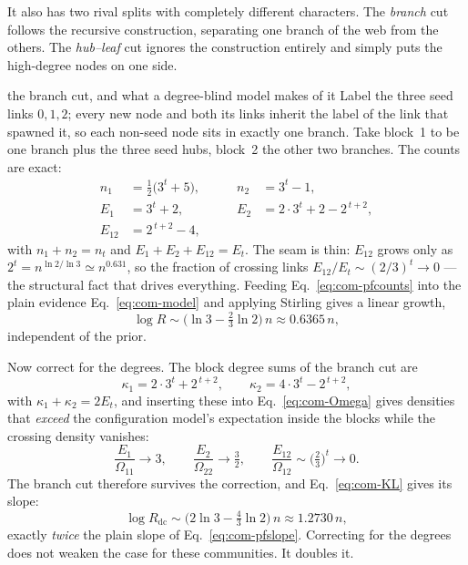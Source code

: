 It also has two rival splits with completely different characters. The
\emph{branch} cut follows the recursive construction, separating one branch of the
web from the others. The \emph{hub--leaf} cut ignores the construction entirely and
simply puts the high-degree nodes on one side.

\begin{calculation}{the branch cut, and what a degree-blind model makes of it}
Label the three seed links $0,1,2$; every new node and both its links inherit the
label of the link that spawned it, so each non-seed node sits in exactly one
branch. Take block~1 to be one branch plus the three seed hubs, block~2 the other
two branches. The counts are exact:
\begin{equation}
\begin{aligned}
  n_1 &= \tfrac{1}{2}\big(3^{t}+5\big), &\qquad n_2 &= 3^{t}-1, \\
  E_1 &= 3^{t}+2, &\qquad E_2 &= 2\cdot 3^{t}+2-2^{\,t+2}, \\
  E_{12} &= 2^{\,t+2}-4, & &
\end{aligned}
\label{eq:com-pfcounts}
\end{equation}
with $n_1+n_2=n_t$ and $E_1+E_2+E_{12}=E_t$. The seam is thin: $E_{12}$ grows only
as $2^{t}=n^{\ln2/\ln3}\simeq n^{0.631}$, so the fraction of crossing links
$E_{12}/E_t\sim(2/3)^{t}\to0$ --- the structural fact that drives everything.
Feeding Eq.~\eqref{eq:com-pfcounts} into the plain evidence
Eq.~\eqref{eq:com-model} and applying Stirling gives a linear growth,
\begin{equation}
  \log R \sim \Big(\ln 3 - \tfrac{2}{3}\ln 2\Big)\,n \approx 0.6365\,n,
  \label{eq:com-pfslope}
\end{equation}
independent of the prior.
\end{calculation}

Now correct for the degrees. The block degree sums of the branch cut are
\begin{equation}
  \kappa_1 = 2\cdot 3^{t}+2^{\,t+2}, \qquad
  \kappa_2 = 4\cdot 3^{t}-2^{\,t+2},
  \label{eq:com-pfkappas}
\end{equation}
with $\kappa_1+\kappa_2=2E_t$, and inserting these into
Eq.~\eqref{eq:com-Omega} gives densities that \emph{exceed} the configuration
model's expectation inside the blocks while the crossing density vanishes:
\begin{equation}
  \frac{E_1}{\Omega_{11}}\to 3, \qquad
  \frac{E_2}{\Omega_{22}}\to \tfrac{3}{2}, \qquad
  \frac{E_{12}}{\Omega_{12}}\sim\Big(\tfrac{2}{3}\Big)^{t}\to 0 .
  \label{eq:com-pfratios}
\end{equation}
The branch cut therefore survives the correction, and Eq.~\eqref{eq:com-KL} gives
its slope:
\begin{equation}
  \log R_{\mathrm{dc}} \sim \Big(2\ln 3 - \tfrac{4}{3}\ln 2\Big)\,n \approx 1.2730\,n,
  \label{eq:com-pfdcslope}
\end{equation}
exactly \emph{twice} the plain slope of Eq.~\eqref{eq:com-pfslope}. Correcting for
the degrees does not weaken the case for these communities. It doubles it.

